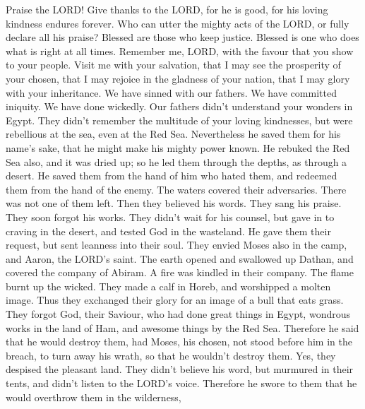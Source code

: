  Praise the LORD! Give thanks to the LORD, for he is good,
for his loving kindness endures forever.  Who can utter
the mighty acts of the LORD, or fully declare all his praise?
 Blessed are those who keep justice. Blessed is one who
does what is right at all times.  Remember me, LORD, with
the favour that you show to your people. Visit me with your salvation,
 that I may see the prosperity of your chosen, that I may
rejoice in the gladness of your nation, that I may glory with your
inheritance.  We have sinned with our fathers. We have
committed iniquity. We have done wickedly.  Our fathers
didn't understand your wonders in Egypt. They didn't remember the
multitude of your loving kindnesses, but were rebellious at the sea,
even at the Red Sea.  Nevertheless he saved them for his
name's sake, that he might make his mighty power known. 
He rebuked the Red Sea also, and it was dried up; so he led them through
the depths, as through a desert.  He saved them from the
hand of him who hated them, and redeemed them from the hand of the
enemy.  The waters covered their adversaries. There was
not one of them left.  Then they believed his words. They
sang his praise.  They soon forgot his works. They didn't
wait for his counsel,  but gave in to craving in the
desert, and tested God in the wasteland.  He gave them
their request, but sent leanness into their soul.  They
envied Moses also in the camp, and Aaron, the LORD's saint.
 The earth opened and swallowed up Dathan, and covered
the company of Abiram.  A fire was kindled in their
company. The flame burnt up the wicked.  They made a calf
in Horeb, and worshipped a molten image.  Thus they
exchanged their glory for an image of a bull that eats grass.
 They forgot God, their Saviour, who had done great
things in Egypt,  wondrous works in the land of Ham, and
awesome things by the Red Sea.  Therefore he said that he
would destroy them, had Moses, his chosen, not stood before him in the
breach, to turn away his wrath, so that he wouldn't destroy them.
 Yes, they despised the pleasant land. They didn't
believe his word,  but murmured in their tents, and
didn't listen to the LORD's voice.  Therefore he swore to
them that he would overthrow them in the wilderness, 
